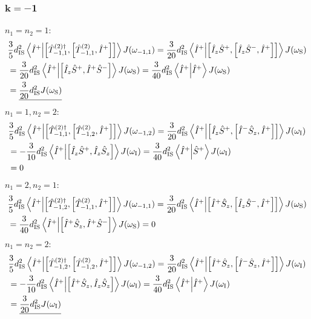 \begin{appendixtext}
\subsubsection{$\mathbf{k = -1}$}
$n_1 = n_2 = 1$:
\begin{align*}
&\frac{3}{5} d_{\text{IS}}^2 \bra{\hat{I}^+} \ket{\comm{\hat{T}_{-1, 1}^{(2) \dagger}}{\comm{\hat{T}_{-1,1}^{(2)}}{\hat{I}^+}}} J(\omega_{-1,1}) = \frac{3}{20} d_{\text{IS}}^2 \bra{\hat{I}^+} \ket{\comm{\hat{I}_z \hat{S}^+}{\comm{\hat{I}_z \hat{S}^-}{\hat{I}^+}}} J(\omega_{\text{S}}) \\
&= \frac{3}{20} d_{\text{IS}}^2 \bra{\hat{I}^+} \ket{\comm{\hat{I}_z \hat{S}^+}{\hat{I}^+ \hat{S}^-}} J(\omega_{\text{S}}) = \frac{3}{40} d_{\text{IS}}^2 \bra{\hat{I}^+} \ket{\hat{I}^+} J(\omega_{\text{S}}) \\
&= \underline{\frac{3}{20} d_{\text{IS}}^2 J(\omega_{\text{S}})}
\end{align*}
$n_1 = 1, n_2 = 2$:
\begin{align*}
&\frac{3}{5} d_{\text{IS}}^2 \bra{\hat{I}^+} \ket{\comm{\hat{T}_{-1, 1}^{(2) \dagger}}{\comm{\hat{T}_{-1,2}^{(2)}}{\hat{I}^+}}} J(\omega_{-1,2}) = \frac{3}{20} d_{\text{IS}}^2 \bra{\hat{I}^+} \ket{\comm{\hat{I}_z \hat{S}^+}{\comm{\hat{I}^- \hat{S}_z}{\hat{I}^+}}} J(\omega_{\text{I}}) \\
&= -\frac{3}{10} d_{\text{IS}}^2 \bra{\hat{I}^+} \ket{\comm{\hat{I}_z \hat{S}^+}{\hat{I}_z \hat{S}_z}} J(\omega_{\text{I}}) =  \frac{3}{40} d_{\text{IS}}^2 \bra{\hat{I}^+} \ket{\hat{S}^+} J(\omega_{\text{I}}) \\
& = 0
\end{align*}
$n_1 = 2, n_2 = 1$:
\begin{align*}
&\frac{3}{5} d_{\text{IS}}^2 \bra{\hat{I}^+} \ket{\comm{\hat{T}_{-1, 2}^{(2) \dagger}}{\comm{\hat{T}_{-1,1}^{(2)}}{\hat{I}^+}}} J(\omega_{-1,1}) = \frac{3}{20} d_{\text{IS}}^2 \bra{\hat{I}^+} \ket{\comm{\hat{I}^+ \hat{S}_z}{\comm{\hat{I}_z \hat{S}^-}{\hat{I}^+}}} J(\omega_{\text{S}}) \\
&= \frac{3}{40} d_{\text{IS}}^2 \bra{\hat{I}^+} \ket{\comm{\hat{I}^+ \hat{S}_z}{\hat{I}^+ \hat{S}^-}} J(\omega_{\text{S}}) = 0
\end{align*}
$n_1 = n_2 = 2$:
\begin{align*}
&\frac{3}{5} d_{\text{IS}}^2 \bra{\hat{I}^+} \ket{\comm{\hat{T}_{-1, 2}^{(2) \dagger}}{\comm{\hat{T}_{-1,2}^{(2)}}{\hat{I}^+}}} J(\omega_{-1,2}) = \frac{3}{20} d_{\text{IS}}^2 \bra{\hat{I}^+} \ket{\comm{\hat{I}^+ \hat{S}_z}{\comm{\hat{I}^- \hat{S}_z}{\hat{I}^+}}} J(\omega_{\text{I}}) \\
&= - \frac{3}{10} d_{\text{IS}}^2 \bra{\hat{I}^+} \ket{\comm{\hat{I}^+ \hat{S}_z}{\hat{I}_z \hat{S}_z}} J(\omega_{\text{I}}) = \frac{3}{40} d_{\text{IS}}^2 \bra{\hat{I}^+} \ket{\hat{I}^+} J(\omega_{\text{I}}) \\
& = \underline{\frac{3}{20} d_{\text{IS}}^2 J(\omega_{\text{I}})}
\end{align*}

\end{appendixtext}
